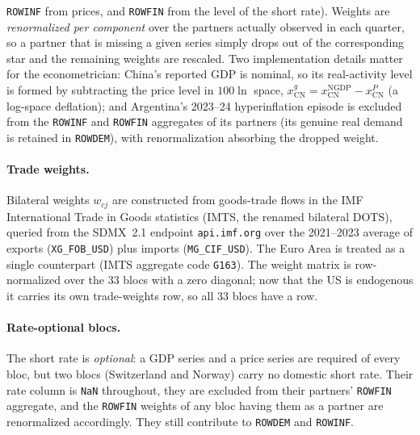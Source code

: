 \documentclass[11pt]{article}
\theoremstyle{definition}
\theoremstyle{remark}
\begin{document}
\texttt{ROWINF} from prices, and \texttt{ROWFIN} from the level of the
short rate). Weights are \emph{renormalized per component} over the
partners actually observed in each quarter, so a partner that is missing
a given series simply drops out of the corresponding star and the
remaining weights are rescaled. Two implementation details matter for
the econometrician: China's reported GDP is nominal, so its
real-activity level is formed by subtracting the price level in $100\ln$
space, $x^{g}_{\mathrm{CN}} = x^{\mathrm{NGDP}}_{\mathrm{CN}} -
x^{P}_{\mathrm{CN}}$ (a log-space deflation); and Argentina's 2023--24
hyperinflation episode is excluded from the \texttt{ROWINF} and
\texttt{ROWFIN} aggregates of its partners (its genuine real demand is
retained in \texttt{ROWDEM}), with renormalization absorbing the dropped
weight.

\paragraph{Trade weights.} Bilateral weights $w_{cj}$ are constructed
from goods-trade flows in the IMF International Trade in Goods statistics
(IMTS, the renamed bilateral DOTS), queried from the SDMX~2.1 endpoint
\texttt{api.imf.org} over the 2021--2023 average of exports
(\texttt{XG\_FOB\_USD}) plus imports (\texttt{MG\_CIF\_USD}). The Euro
Area is treated as a single counterpart (IMTS aggregate code
\texttt{G163}). The weight matrix is row-normalized over the 33 blocs
with a zero diagonal; now that the US is endogenous it carries its own
trade-weights row, so all $33$ blocs have a row.

\paragraph{Rate-optional blocs.} The short rate is \emph{optional}: a
GDP series and a price series are required of every bloc, but two blocs
(Switzerland and Norway) carry no domestic short rate. Their rate column
is \texttt{NaN} throughout, they are excluded from their partners'
\texttt{ROWFIN} aggregate, and the \texttt{ROWFIN} weights of any bloc
having them as a partner are renormalized accordingly. They still
contribute to \texttt{ROWDEM} and \texttt{ROWINF}.
\end{document}
